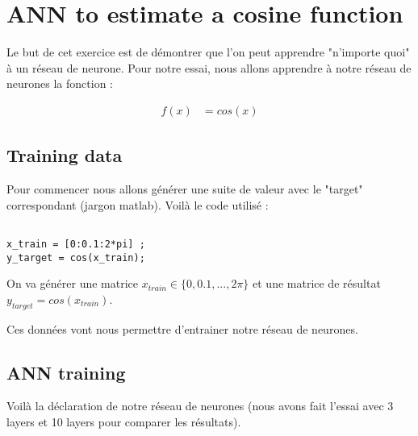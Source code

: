 
\chapter{ANN to estimate a cosine function} %

\label{Chapitre 4.1} %


Le but de cet exercice est de démontrer que l'on peut apprendre "n'importe quoi" à un réseau de neurone. Pour notre essai, nous allons apprendre à notre réseau de neurones la fonction : 

\begin{align*}
f(x) &= cos(x)
\end{align*} 

\section{Training data}

Pour commencer nous allons générer une suite de valeur avec le "target" correspondant (jargon matlab). Voilà le code utilisé :

\begin{lstlisting}[frame=single,style=C]  % Start your code-block

x_train = [0:0.1:2*pi] ;
y_target = cos(x_train);
\end{lstlisting}


On va générer une matrice $x_{train} \in \{0,0.1, ... , 2\pi\}$ et une matrice de résultat $y_{target} = cos(x_{train})$. 

Ces données vont nous permettre d'entrainer notre réseau de neurones.
\pagebreak

\section{ANN training}


Voilà la déclaration de notre réseau de neurones (nous avons fait l'essai avec 3 layers et 10 layers pour comparer les résultats).

